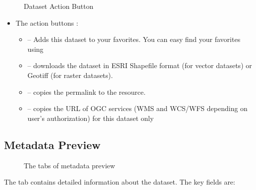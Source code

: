 \documentclass[letterpaper,10pt,english]{sphinxmanual}
\begin{document}
\begin{figure}[htbp]
\centering
\capstart

\noindent{}
\caption{Dataset Action Button}\label{\detokenize{02_find_and_visualize:id13}}\end{figure}
\begin{itemize}
\item {} 
\sphinxAtStartPar
The action buttons :
\begin{itemize}
\item {} 
\sphinxAtStartPar
{}  – Adds this dataset to your favorites. You can easy find your favorites using  {\hyperref[\detokenize{02_find_and_visualize:advanced-filter}]{}}

\item {} 
\sphinxAtStartPar
{}  – downloads the dataset in ESRI Shapefile format (for vector datasets) or Geotiff (for raster datasets).

\item {} 
\sphinxAtStartPar
{}  – copies the permalink to the resource.

\item {} 
\sphinxAtStartPar
{}  – copies the URL of OGC services (WMS and WCS/WFS depending on user’s authorization) for this dataset only

\end{itemize}

\end{itemize}


\subsection{Metadata Preview}
\label{\detokenize{02_find_and_visualize:metadata-preview}}
\begin{figure}[htbp]
\centering
\capstart

\noindent{}
\caption{The tabs of metadata preview}\label{\detokenize{02_find_and_visualize:id14}}\end{figure}

\sphinxAtStartPar
The  tab contains detailed information about the
dataset. The key fields are:
\end{document}
